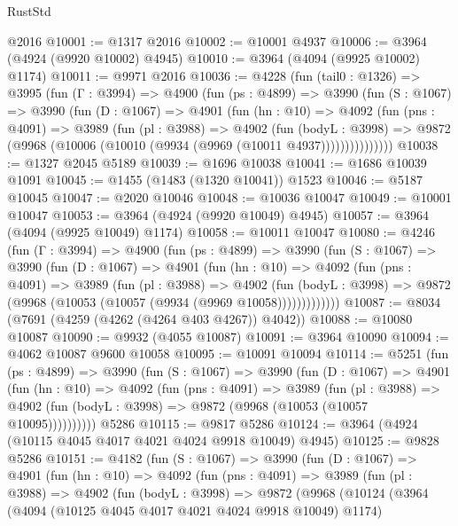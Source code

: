 \begin{lexlean}{RustStd}
\begin{coremodule}
    @2016
@10001 := @1317 @2016
@10002 := @10001 @4937
@10006 := @3964 (@4924 (@9920 @10002) @4945)
@10010 := @3964 (@4094 (@9925 @10002) @1174)
@10011 := @9971 @2016
@10036 := @4228
    (fun (tail0 : @1326) =>
    @3995
      (fun (Γ : @3994) =>
      @4900
        (fun (ps : @4899) =>
        @3990
          (fun (S : @1067) =>
          @3990
            (fun (D : @1067) =>
            @4901
              (fun (hn : @10) =>
              @4092
                (fun (pns : @4091) =>
                @3989
                  (fun (pl : @3988) =>
                  @4902
                    (fun (bodyL : @3998) =>
                    @9872 (@9968 (@10006 (@10010 (@9934 (@9969 (@10011 @4937)))))))))))))))
@10038 := @1327 @2045 @5189
@10039 := @1696 @10038
@10041 := @1686 @10039 @1091
@10045 := @1455 (@1483 (@1320 @10041)) @1523
@10046 := @5187 @10045
@10047 := @2020 @10046
@10048 := @10036 @10047
@10049 := @10001 @10047
@10053 := @3964 (@4924 (@9920 @10049) @4945)
@10057 := @3964 (@4094 (@9925 @10049) @1174)
@10058 := @10011 @10047
@10080 := @4246
    (fun (Γ : @3994) =>
    @4900
      (fun (ps : @4899) =>
      @3990
        (fun (S : @1067) =>
        @3990
          (fun (D : @1067) =>
          @4901
            (fun (hn : @10) =>
            @4092
              (fun (pns : @4091) =>
              @3989
                (fun (pl : @3988) =>
                @4902
                  (fun (bodyL : @3998) =>
                  @9872 (@9968 (@10053 (@10057 (@9934 (@9969 @10058)))))))))))))
@10087 := @8034 (@7691 (@4259 (@4262 (@4264 @403 @4267)) @4042))
@10088 := @10080 @10087
@10090 := @9932 (@4055 @10087)
@10091 := @3964 @10090
@10094 := @4062 @10087 @9600 @10058
@10095 := @10091 @10094
@10114 := @5251
    (fun (ps : @4899) =>
    @3990
      (fun (S : @1067) =>
      @3990
        (fun (D : @1067) =>
        @4901
          (fun (hn : @10) =>
          @4092
            (fun (pns : @4091) =>
            @3989
              (fun (pl : @3988) =>
              @4902 (fun (bodyL : @3998) => @9872 (@9968 (@10053 (@10057 @10095))))))))))
    @5286
@10115 := @9817 @5286
@10124 := @3964 (@4924 (@10115 @4045 @4017 @4021 @4024 @9918 @10049) @4945)
@10125 := @9828 @5286
@10151 := @4182
    (fun (S : @1067) =>
    @3990
      (fun (D : @1067) =>
      @4901
        (fun (hn : @10) =>
        @4092
          (fun (pns : @4091) =>
          @3989
            (fun (pl : @3988) =>
            @4902
              (fun (bodyL : @3998) =>
              @9872
                (@9968
                  (@10124
                    (@3964
                      (@4094 (@10125 @4045 @4017 @4021 @4024 @9918 @10049) @1174)

\end{coremodule}
\end{lexlean}
